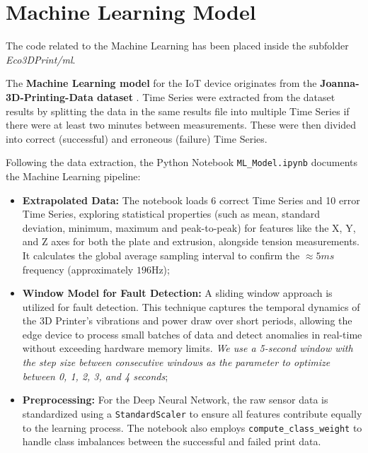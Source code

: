 \newpage

\section{Machine Learning Model}
The code related to the Machine Learning has been placed inside the subfolder \textit{Eco3DPrint/ml}.

\medspace

The \textbf{Machine Learning model} for the IoT device originates from the \textbf{Joanna-3D-Printing-Data dataset} \cite{joanna}. Time Series were extracted from the dataset results by splitting the data in the same results file into multiple Time Series if there were at least two minutes between measurements. These were then divided into correct (successful) and erroneous (failure) Time Series. 
\medspace

Following the data extraction, the Python Notebook \texttt{ML\_Model.ipynb} documents the Machine Learning pipeline:
\begin{itemize}
	\item \textbf{Extrapolated Data:} The notebook loads 6 correct Time Series and 10 error Time Series, exploring statistical properties (such as mean, standard deviation, minimum, maximum and peak-to-peak) for features like the X, Y, and Z axes for both the plate and extrusion, alongside tension measurements. It calculates the global average sampling interval to confirm the $\approx 5ms$ frequency (approximately $196$Hz);
	\item \textbf{Window Model for Fault Detection:} A sliding window approach is utilized for fault detection. This technique captures the temporal dynamics of the 3D Printer's vibrations and power draw over short periods, allowing the edge device to process small batches of data and detect anomalies in real-time without exceeding hardware memory limits. \textit{We use a 5-second window with the step size between consecutive windows as the parameter to optimize between 0, 1, 2, 3, and 4 seconds};
	\item \textbf{Preprocessing:} For the Deep Neural Network, the raw sensor data is standardized using a \texttt{StandardScaler} to ensure all features contribute equally to the learning process. The notebook also employs \texttt{compute\_class\_weight} to handle class imbalances between the successful and failed print data.
\end{itemize}

